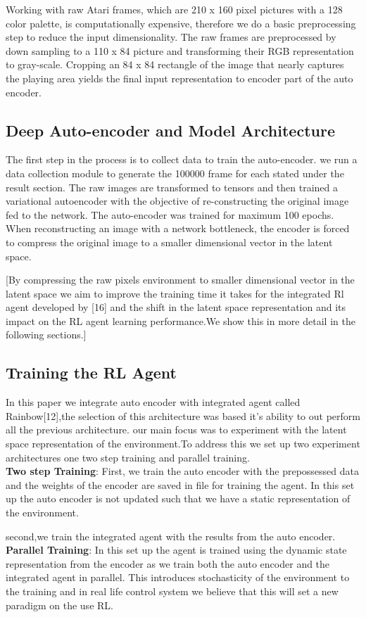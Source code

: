 Working with raw Atari frames, 
which are 210 x 160 pixel pictures with a 
128 color palette, is computationally expensive, therefore we do a 
basic preprocessing step to reduce the input dimensionality. 
The raw frames are preprocessed by down sampling to a 110 x 84 
picture and transforming their RGB representation to gray-scale.
Cropping an 84 x 84 rectangle of the image that nearly 
captures the playing area yields the final input representation to encoder part of the auto encoder.


\subsection{Deep Auto-encoder and Model Architecture}

The first step in the process is to collect data to train the auto-encoder. 
we run a data collection module to generate the 100000 frame 
for each stated under the result section.
The raw images are transformed to tensors and then trained a variational autoencoder 
with the objective of re-constructing the original image fed to the network. 
The auto-encoder was trained for maximum  100 epochs.
When reconstructing an image with a network bottleneck, 
the encoder is forced to compress the original image to a smaller dimensional vector in the latent space.

[By compressing the raw pixels environment to smaller dimensional 
vector in the latent space we aim to improve the training 
time it takes for the integrated Rl agent developed by [16] 
and the shift in the latent space representation and its impact on 
the RL agent learning performance.We show this in more detail in the following sections.]


\subsection{Training the RL Agent} 

In this paper we integrate auto encoder with integrated agent 
called Rainbow[12],the selection of this architecture  was 
based it's ability to out perform all the previous architecture.
our main focus was to experiment with the latent space representation 
of the environment.To address this we set up two experiment architectures one two step training and parallel training.\\

\textbf{Two step Training}: First,
we train the auto encoder with the prepossessed data and the 
weights of the encoder are saved in file for training the agent.
In this set up the auto encoder is not updated such that we have a static representation of the environment.

second,we train the integrated agent with the results from the auto encoder.\\

\textbf{Parallel Training}:
In this set up the agent is trained using the dynamic 
state representation from the encoder as we train both the auto 
encoder and the integrated agent in parallel.
This introduces stochasticity of the environment to the training  and 
in real life control system we believe that this will set a new paradigm on the use RL.



